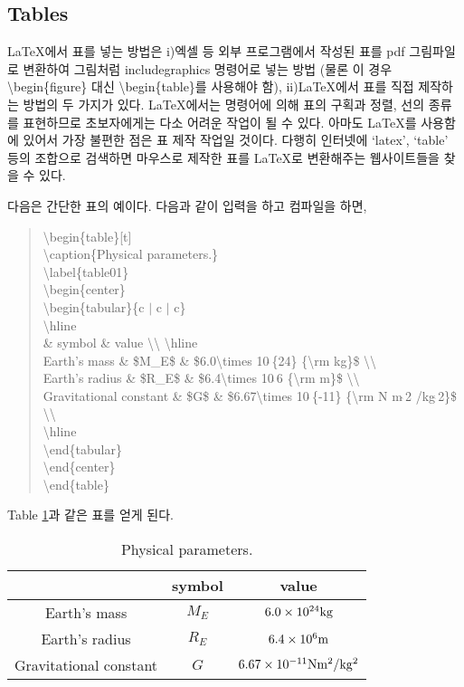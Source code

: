 \documentclass{gshs-report-v1.2}
\begin{document}
\subsection{Tables}

\LaTeX 에서 표를 넣는 방법은 i)엑셀 등 외부 프로그램에서 작성된 표를 pdf 그림파일로 변환하여 그림처럼 includegraphics 명령어로 넣는 방법 (물론 이 경우 {\textbackslash}begin\{figure\} 대신 {\textbackslash}begin\{table\}를 사용해야 함), ii)\LaTeX 에서 표를 직접 제작하는 방법의 두 가지가 있다. \LaTeX 에서는 명령어에 의해 표의 구획과 정렬, 선의 종류를 표현하므로 초보자에게는 다소 어려운 작업이 될 수 있다. 아마도 \LaTeX 를 사용함에 있어서 가장 불편한 점은 표 제작 작업일 것이다. 다행히 인터넷에 `latex', `table' 등의 조합으로 검색하면 마우스로 제작한 표를 \LaTeX 로 변환해주는 웹사이트들을 찾을 수 있다.

다음은 간단한 표의 예이다. 다음과 같이 입력을 하고 컴파일을 하면,
\begin{quote}
	{\textbackslash}begin\{table\}[t]\\
	{\textbackslash}caption\{Physical parameters.\}\\
	{\textbackslash}label\{table01\}\\
	{\textbackslash}begin\{center\}\\
	{\textbackslash}begin\{tabular\}\{c $|$ c $|$ c\}\\
	{\textbackslash}hline\\
	\& symbol \& value {\textbackslash}{\textbackslash} {\textbackslash}hline \\
	Earth's mass \& \$M\_E\$ \& \$6.0{\textbackslash}times 10$\hat{\ }$\{24\} \{{\textbackslash}rm kg\}\$ {\textbackslash}{\textbackslash}\\
	Earth's radius \& \$R\_E\$ \& \$6.4{\textbackslash}times 10$\hat{\ }$6 \{{\textbackslash}rm m\}\$ {\textbackslash}{\textbackslash}\\
	Gravitational constant \& \$G\$ \& \$6.67{\textbackslash}times 10$\hat{\ }$\{-11\} \{{\textbackslash}rm N m$\hat{\ }$2 /kg$\hat{\ }$2\}\$ {\textbackslash}{\textbackslash} \\
	{\textbackslash}hline\\
	{\textbackslash}end\{tabular\}\\
	{\textbackslash}end\{center\}\\
	{\textbackslash}end\{table\}
\end{quote}
Table \ref{table01}과 같은 표를 얻게 된다.
\begin{table}[t]
	\caption{Physical parameters.} \label{table01}
	\begin{center}
		\begin{tabular}{c|c|c}
			\hline
			& symbol & value \\ \hline
			Earth's mass & $M_E$ & $6.0\times 10^{24} {\rm kg}$ \\
			Earth's radius & $R_E$ & $6.4\times 10^6 {\rm m}$ \\
			Gravitational constant & $G$ & $6.67\times 10^{-11} {\rm N m^2 /kg^2}$ \\ \hline
		\end{tabular}
	\end{center}
\end{table}
\end{document}
